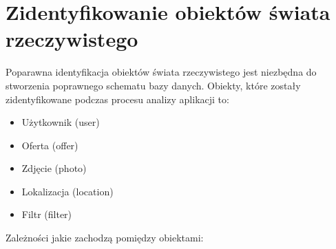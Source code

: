 \section{Zidentyfikowanie obiektów świata rzeczywistego}
Poparawna identyfikacja obiektów świata rzeczywistego jest niezbędna do stworzenia poprawnego schematu bazy danych. Obiekty, które zostały zidentyfikowane podczas procesu analizy aplikacji to:
\begin{itemize}
\item Użytkownik (user)
\item Oferta (offer)
\item Zdjęcie (photo)
\item Lokalizacja (location)
\item Filtr (filter)
\end{itemize}
Zależności jakie zachodzą pomiędzy obiektami:\\
\noindent
\begin{minipage}{\linewidth}
\label{use-case}
\end{minipage}
